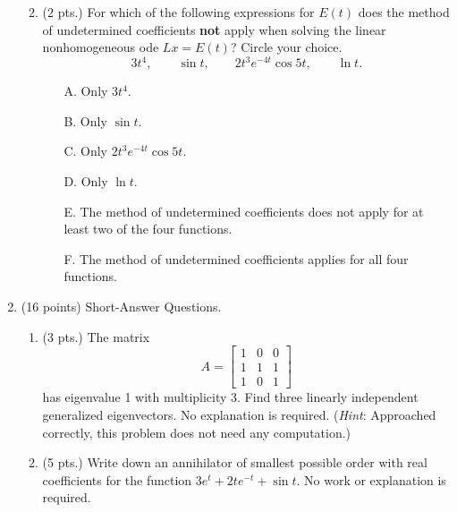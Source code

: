 \documentclass[12pt]{article}
\begin{document}
\begin{enumerate}
\begin{enumerate}
\newpage
\vspace*{-.5in}
\item (2 pts.) For which of the following expressions for $E(t)$ does the method of
undetermined coefficients \textbf{not} apply when solving the linear nonhomogeneous
ode $Lx = E(t)$?  Circle your choice.
\[
3t^4, \qquad \sin t, \qquad 2t^3e^{-4t} \cos 5t, \qquad \ln t.
\]

\begin{enumerate}
  \item[A.] Only $3t^4$.
\item[B.] Only $\sin t$.
\item[C.] Only $2t^3e^{-4t} \cos 5t$.
\item[D.] Only $\ln t$.
\item[E.] The method of undetermined coefficients does not apply for at least two of the four functions.
  \item[F.] The method of undetermined coefficients applies for all four functions.
  \end{enumerate}
  
\end{enumerate}

\vspace*{.5in}

\item (16 points) Short-Answer Questions.
  \begin{enumerate}

      \item (3 pts.) The matrix 
\begin{equation*}
          A = \left[
            \begin{array}{rrr}
              1 & 0 & 0 \\
              1 & 1 & 1\\
              1 & 0 & 1
            \end{array}
          \right]
        \end{equation*}
has eigenvalue 1 with multiplicity 3.  Find three linearly independent
generalized eigenvectors.  No explanation is required.  (\textit{Hint}:  Approached correctly, this
problem does not need any computation.)

\vfill

\newpage

\item (5 pts.) Write down an annihilator of smallest possible order
  with real coefficients for the function $3e^t + 2te^{-t} + \sin t$.
  No work or explanation is required.
  

\end{enumerate}
\end{enumerate}
\end{document}
